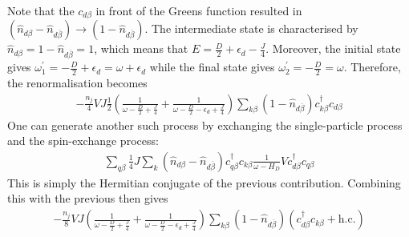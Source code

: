 Note that the \(c_{d\beta}\) in front of the Greens function resulted in \(\left(\hat n_{d\beta} - \hat n_{d\overline\beta}\right) \to \left(1 - \hat n_{d\overline\beta}\right)\). The intermediate state is characterised by \(\hat n_{d\beta} = 1 - \hat n_{d \overline \beta} = 1\), which means that \(E = \frac{D}{2} + \epsilon_d - \frac{J}{4}\). Moreover, the initial state gives \(\omega_1^\prime = -\frac{D}{2} + \epsilon_d = \omega + \epsilon_d\) while the final state gives \(\omega^\prime_2 = -\frac{D}{2} = \omega\). Therefore, the renormalisation becomes
\begin{equation}\begin{aligned}
	-\frac{n_j}{4}V J \frac{1}{2}\left(\frac{1}{\omega - \frac{D}{2} + \frac{J}{4}} + \frac{1}{\omega - \frac{D}{2} - \epsilon_d + \frac{J}{4}}\right)\sum_{k\beta}\left(1 - \hat n_{d\overline\beta}\right) c^\dagger_{k\beta} c_{d\beta}
\end{aligned}\end{equation}
One can generate another such process by exchanging the single-particle process and the spin-exchange process:
\begin{equation}\begin{aligned}
	\sum_{q\beta} \frac{1}{4}J \sum_{k} \left(\hat n_{d\beta} - \hat n_{d\overline\beta}\right) c^\dagger_{q\beta}c_{k\beta} \frac{1}{\omega - H_D} V c^\dagger_{d\beta} c_{q\beta}
\end{aligned}\end{equation}
This is simply the Hermitian conjugate of the previous contribution. Combining this with the previous then gives
\begin{equation}\begin{aligned}
	-\frac{n_j}{8}V J \left(\frac{1}{\omega - \frac{D}{2} + \frac{J}{4}} + \frac{1}{\omega - \frac{D}{2} - \epsilon_d + \frac{J}{4}}\right) \sum_{k\beta}\left(1 - \hat n_{d\overline\beta}\right)\left(c^\dagger_{d\beta} c_{k\beta} + \text{h.c.}\right)
\end{aligned}\end{equation}

